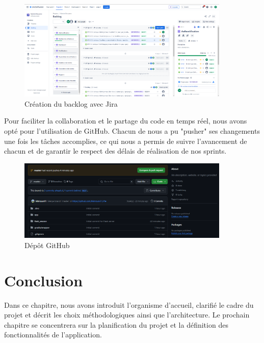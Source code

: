 \begin{figure}[ht]
    \centering
    \includegraphics[width=0.9\textwidth]{chap1.images/jira.png}
    \caption{Création du backlog avec Jira}
\end{figure}
\newpage
Pour faciliter la collaboration et le partage du code en temps réel, nous avons opté pour l'utilisation de GitHub. Chacun de nous a pu "pusher" ses changements une fois les tâches accomplies, ce qui nous a permis de suivre l'avancement de chacun et de garantir le respect des délais de réalisation de nos sprints. \\
\begin{figure}[ht]
    \centering
    \includegraphics[width=0.9\textwidth]{chap1.images/depot git.png}

    \caption{Dépôt GitHub}
\end{figure}




\section*{Conclusion}
\bigskip
\begin{sloppypar}
    Dans ce chapitre, nous avons introduit l’organisme d’accueil, clarifié le cadre du projet  et décrit les choix méthodologiques ainsi que l’architecture. Le prochain chapitre se concentrera sur la planification du projet et la définition des fonctionnalités de l’application.
\end{sloppypar}









